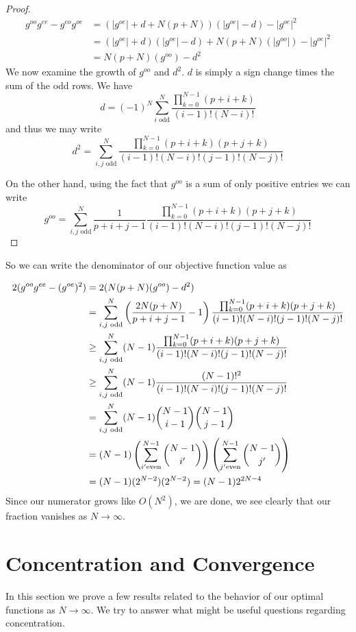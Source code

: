 \documentclass[11pt]{article}
\theoremstyle{definition}
\theoremstyle{remark}
\numberwithin{equation}{section}
\begin{document}
\begin{proof}
\begin{align*}
g^{oo} g^{ee} - g^{eo}g^{oe} &=  (|g^{oe}| + d + N(p+N)) (|g^{oe}| - d) - |g^{oe}|^2 \\
&= (|g^{oe}|+d)(|g^{oe}| - d) + N(p+N)(|g^{oo}|) - |g^{oe}|^2\\
&= N(p+N)(g^{oo}) - d^2
\end{align*}
We now examine the growth of $g^{oo}$ and $d^2$. $d$ is simply a sign change times the sum of the odd rows. We have
\[d = (-1)^N \sum_{i \text{ odd}}^N \frac{\prod_{k=0}^{N-1} (p+i+k)}{(i-1)!(N-i)!} \] 
and thus we may write 
\[d^2 = \sum_{i,j \text{ odd}}^N 
\frac{\prod_{k=0}^{N-1} (p+i+k)(p+j+k)}{(i-1)! (N-i)! (j-1)! (N-j)!} \]

On the other hand, using the fact that $g^{oo}$ is a sum of only positive entries we can write 
\[g^{oo} = \sum_{i,j \text{ odd}}^N \frac{1}{p+i+j-1} \frac{\prod_{k=0}^{N-1} (p+i+k)(p+j+k)}{(i-1)! (N-i)! (j-1)! (N-j)!}\]
\end{proof} So we can write the denominator of our objective function value as

\begin{align*} 2(g^{oo} g^{ee}-(g^{oe})^2) &= 2(N(p+N)(g^{oo}) - d^2)\\ &= \sum_{i,j \text{ odd}}^N \left( \frac{2N(p+N)}{p+i+j-1} - 1\right) \frac{\prod_{k=0}^{N-1} (p+i+k)(p+j+k)}{(i-1)! (N-i)! (j-1)! (N-j)!} \\
& \ge \sum_{i,j \text{ odd}}^N (N-1) \frac{\prod_{k=0}^{N-1} (p+i+k)(p+j+k)}{(i-1)! (N-i)! (j-1)! (N-j)!}\\
&\ge \sum_{i,j \text{ odd}}^N (N-1) \frac{(N-1)!^2}{(i-1)! (N-i)! (j-1)! (N-j)!} \\
&= \sum_{i,j \text{ odd}}^N (N-1) \dbinom{N-1}{i-1} \dbinom{N-1}{j-1}\\
&= (N-1) \left(\sum_{i' \text{even}}^{N-1} \dbinom{N-1}{i'}\right) \left( \sum_{j' \text{even}}^{N-1} \dbinom{N-1}{j'}\right)\\
&= (N-1)(2^{N-2})(2^{N-2}) = (N-1)2^{2N-4}
\end{align*} 
Since our numerator grows like $O(N^2)$, we are done, we see clearly that our fraction vanishes as $N \to \infty$.

\section{Concentration and Convergence}

In this section we prove a few results related to the behavior of our optimal functions as $N\to \infty$. We try to answer what might be useful questions regarding concentration. 
\end{document}
